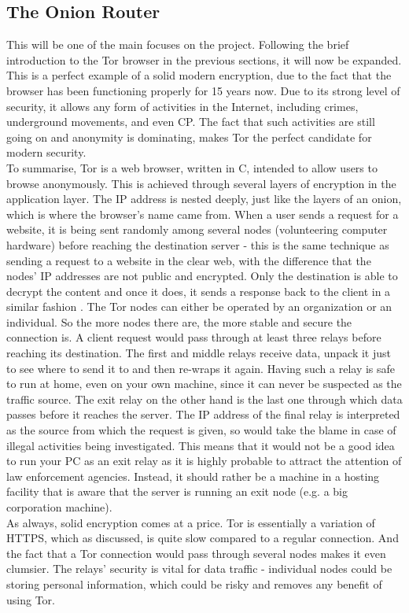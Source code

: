 \documentclass[a4paper, 12pt, titlepage]{article}
\begin{document}
\subsection{The Onion Router}
This will be one of the main focuses on the project. Following the brief introduction to the Tor browser in the previous sections, it will now be expanded. This is a perfect example of a solid modern encryption, due to the fact that the browser has been functioning properly for 15 years now. Due to its strong level of security, it allows any form of activities in the Internet, including crimes, underground movements, and even CP. The fact that such activities are still going on and anonymity is dominating, makes Tor the perfect candidate for modern security. \\[6pt]
To summarise, Tor is a web browser, written in C, intended to allow users to browse anonymously. This is achieved through several layers of encryption in the application layer. The IP address is nested deeply, just like the layers of an onion, which is where the browser's name came from. When a user sends a request for a website, it is being sent randomly among several nodes (volunteering computer hardware) before reaching the destination server - this is the same technique as sending a request to a website in the clear web, with the difference that the nodes' IP addresses are not public and encrypted. Only the destination is able to decrypt the content and once it does, it sends a response back to the client in a similar fashion \cite{TORInfo}. The Tor nodes can either be operated by an organization or an individual. So the more nodes there are, the more stable and secure the connection is. A client request would pass through at least three relays before reaching its destination. The first and middle relays receive data, unpack it just to see where to send it to and then re-wraps it again. Having such a relay is safe to run at home, even on your own machine, since it can never be suspected as the traffic source. The exit relay on the other hand is the last one through which data passes before it reaches the server. The IP address of the final relay is interpreted as the source from which the request is given, so would take the blame in case of illegal activities being investigated. This means that it would not be a good idea to run your PC as an exit relay as it is highly probable to attract the attention of law enforcement agencies. Instead, it should rather be a machine in a hosting facility that is aware that the server is running an exit node (e.g. a big corporation machine). \\[6pt]
As always, solid encryption comes at a price. Tor is essentially a variation of HTTPS, which as discussed, is quite slow compared to a regular connection. And the fact that a Tor connection would pass through several nodes makes it even clumsier. The relays' security is vital for data traffic - individual nodes could be storing personal information, which could be risky and removes any benefit of using Tor.
\end{document}
